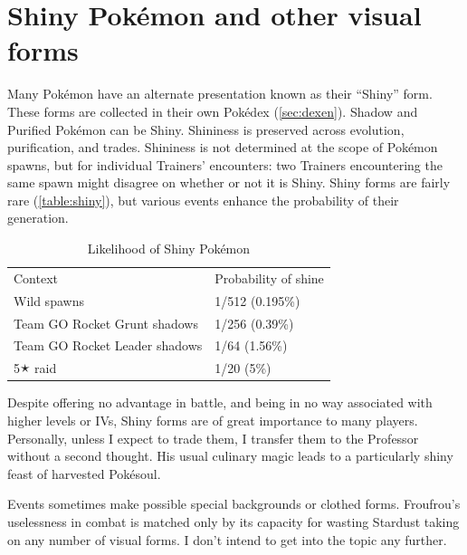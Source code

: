 \section{Shiny Pokémon and other visual forms}
\label{sec:shiny}
Many Pokémon have an alternate presentation known as their ``Shiny'' form.
These forms are collected in their own Pokédex (\autoref{sec:dexen}).
Shadow and Purified Pokémon can be Shiny.
Shininess is preserved across evolution, purification, and trades.
Shininess is not determined at the scope of Pokémon spawns, but for individual
  Trainers' encounters: two Trainers encountering the same spawn might disagree
  on whether or not it is Shiny.
Shiny forms are fairly rare (\autoref{table:shiny}), but various events
  enhance the probability of their generation.
\begin{table}[ht]
\begin{center}
\begin{tabular}{ll}
Context & Probability of shine \\
\Midrule
  Wild spawns & 1/512 (0.195\%) \\
  Team GO Rocket Grunt shadows & 1/256 (0.39\%) \\
  Team GO Rocket Leader shadows & 1/64 (1.56\%) \\
  5🟉 raid & 1/20 (5\%) \\
\end{tabular}
\end{center}
\caption{Likelihood of Shiny Pokémon}
\label{table:shiny}
\end{table}

Despite offering no advantage in battle, and being in no way associated with
  higher levels or IVs, Shiny forms are of great importance to many players.
Personally, unless I expect to trade them, I transfer them to the Professor
  without a second thought.
His usual culinary magic leads to a particularly shiny feast of harvested Pokésoul.

Events sometimes make possible special backgrounds or clothed forms.
Froufrou's uselessness in combat is matched only by its
  capacity for wasting Stardust taking on any number of visual forms.
I don't intend to get into the topic any further.
